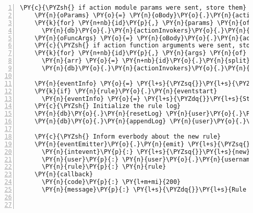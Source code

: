 \begin{Verbatim}[fontsize=\scriptsize,commandchars=\\\{\},numbers=left,firstnumber=1,stepnumber=1]
    \PY{c}{\PYZsh{} if action module params were sent, store them}
    \PY{n}{oParams} \PY{o}{=} \PY{n}{oBody}\PY{o}{.}\PY{n}{actionparams}
    \PY{k}{for} \PY{n+nb}{id}\PY{p}{,} \PY{n}{params} \PY{n}{of} \PY{n}{oParams}
      \PY{n}{db}\PY{o}{.}\PY{n}{actionInvokers}\PY{o}{.}\PY{n}{storeUserParams} \PY{n+nb}{id}\PY{p}{,} \PY{n}{user}\PY{o}{.}\PY{n}{username}\PY{p}{,} \PY{n}{JSON}\PY{o}{.}\PY{n}{stringify} \PY{n}{params}
    \PY{n}{oFuncArgs} \PY{o}{=} \PY{n}{oBody}\PY{o}{.}\PY{n}{actionfunctions}
    \PY{c}{\PYZsh{} if action function arguments were sent, store them}
    \PY{k}{for} \PY{n+nb}{id}\PY{p}{,} \PY{n}{args} \PY{n}{of} \PY{n}{oFuncArgs}
      \PY{n}{arr} \PY{o}{=} \PY{n+nb}{id}\PY{o}{.}\PY{n}{split} \PY{l+s}{\PYZsq{}}\PY{l+s}{ \PYZhy{}\PYZgt{} }\PY{l+s}{\PYZsq{}}
      \PY{n}{db}\PY{o}{.}\PY{n}{actionInvokers}\PY{o}{.}\PY{n}{storeUserArguments} \PY{n}{user}\PY{o}{.}\PY{n}{username}\PY{p}{,} \PY{n}{rule}\PY{o}{.}\PY{n}{id}\PY{p}{,} \PY{n}{arr}\PY{p}{[} \PY{l+m+mi}{0} \PY{p}{]}\PY{p}{,} \PY{n}{arr}\PY{p}{[} \PY{l+m+mi}{1} \PY{p}{]}\PY{p}{,} \PY{n}{JSON}\PY{o}{.}\PY{n}{stringify} \PY{n}{args} 
    
    \PY{n}{eventInfo} \PY{o}{=} \PY{l+s}{\PYZsq{}}\PY{l+s}{\PYZsq{}}
    \PY{k}{if} \PY{n}{rule}\PY{o}{.}\PY{n}{eventstart}
      \PY{n}{eventInfo} \PY{o}{=} \PY{l+s}{\PYZdq{}}\PY{l+s}{Starting at \PYZsh{}\PYZob{} new Date( rule.eventstart ) \PYZcb{}, Interval set to \PYZsh{}\PYZob{} rule.eventinterval \PYZcb{} minutes}\PY{l+s}{\PYZdq{}}
    \PY{c}{\PYZsh{} Initialize the rule log}
    \PY{n}{db}\PY{o}{.}\PY{n}{resetLog} \PY{n}{user}\PY{o}{.}\PY{n}{username}\PY{p}{,} \PY{n}{rule}\PY{o}{.}\PY{n}{id}
    \PY{n}{db}\PY{o}{.}\PY{n}{appendLog} \PY{n}{user}\PY{o}{.}\PY{n}{username}\PY{p}{,} \PY{n}{rule}\PY{o}{.}\PY{n}{id}\PY{p}{,} \PY{l+s}{\PYZdq{}}\PY{l+s}{INIT}\PY{l+s}{\PYZdq{}}\PY{p}{,} \PY{l+s}{\PYZdq{}}\PY{l+s}{Rule }\PY{l+s}{\PYZsq{}}\PY{l+s}{\PYZsh{}\PYZob{} rule.id \PYZcb{}}\PY{l+s}{\PYZsq{}}\PY{l+s}{ initialized. \PYZsh{}\PYZob{} eventInfo \PYZcb{}}\PY{l+s}{\PYZdq{}}
    
    \PY{c}{\PYZsh{} Inform everbody about the new rule}
    \PY{n}{eventEmitter}\PY{o}{.}\PY{n}{emit} \PY{l+s}{\PYZsq{}}\PY{l+s}{rule}\PY{l+s}{\PYZsq{}}\PY{p}{,}
      \PY{n}{intevent}\PY{p}{:} \PY{l+s}{\PYZsq{}}\PY{l+s}{new}\PY{l+s}{\PYZsq{}}
      \PY{n}{user}\PY{p}{:} \PY{n}{user}\PY{o}{.}\PY{n}{username}
      \PY{n}{rule}\PY{p}{:} \PY{n}{rule}
    \PY{n}{callback}
      \PY{n}{code}\PY{p}{:} \PY{l+m+mi}{200}
      \PY{n}{message}\PY{p}{:} \PY{l+s}{\PYZdq{}}\PY{l+s}{Rule }\PY{l+s}{\PYZsq{}}\PY{l+s}{\PYZsh{}\PYZob{} rule.id \PYZcb{}}\PY{l+s}{\PYZsq{}}\PY{l+s}{ stored and activated!}\PY{l+s}{\PYZdq{}}



\end{Verbatim}
